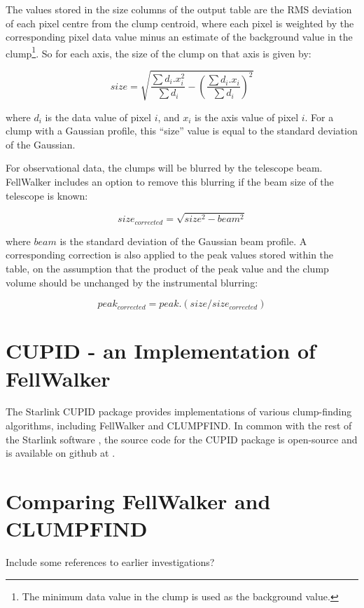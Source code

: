 \documentclass[final,authoryear,5p,times,twocolumn]{elsarticle}
\begin{document}
The values stored in the size columns of the output table are the RMS
deviation of each pixel centre from the clump centroid, where each pixel
is weighted by the corresponding pixel data value minus an estimate of
the background value in the clump\footnote{The minimum data value in the
clump is used as the background value.}. So for each axis, the size of
the clump on that axis is given by:

\[ size = \sqrt{ \frac{ \sum d_{i}.x_{i}^{2} }{ \sum d_{i} } -
\left( \frac{\sum d_{i}.x_{i} }{\sum d_{i}}  \right)^2 } \]

where $d_{i}$ is the data value of pixel $i$, and $x_{i}$ is the axis
value of pixel $i$. For a clump with a Gaussian profile, this
``size'' value is equal to the standard deviation of the Gaussian.

For observational data, the clumps will be blurred by the telescope beam.
FellWalker includes an option to remove this blurring if the beam size of
the telescope is known:

\[ size_{corrected} = \sqrt{ size^{2} - beam^{2} } \]

where $beam$ is the standard deviation of the Gaussian beam profile. A
corresponding correction is also applied to the peak values stored within
the table, on the assumption that the product of the peak value and the
clump volume should be unchanged by the instrumental blurring:

\[ peak_{corrected} = peak.(size/size_{corrected}) \]




\section{\label{sec:cupid}CUPID - an Implementation of FellWalker}
The Starlink CUPID package \citep[][]{CupidAdass,SUN255} provides
implementations of various clump-finding algorithms, including FellWalker
and CLUMPFIND. In common with the rest of the Starlink software \citep[][]{StarlinkAdass},
the source code for the CUPID package is open-source and is available on github at
.

\section{Comparing FellWalker and CLUMPFIND}

Include some references to earlier investigations?
\citep[e.g.][]{2010Watson,2013Urquhart}
\end{document}
